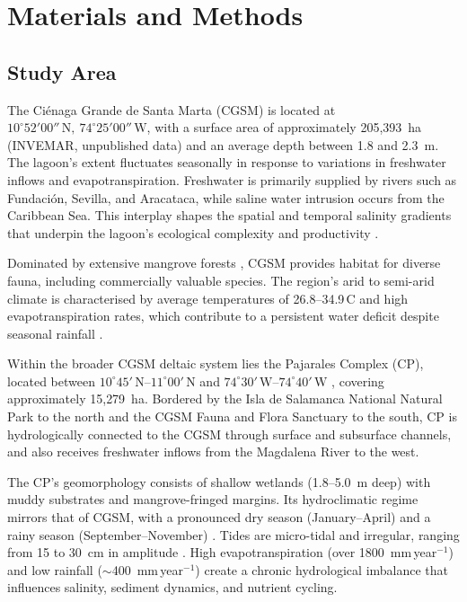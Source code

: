 \documentclass[remotesensing,article,submit,pdftex,moreauthors]{Definitions/mdpi}
\begin{document}
\section{Materials and Methods}
\subsection{Study Area}

The Ci\'{e}naga Grande de Santa Marta (CGSM) is located at
$10^\circ52'00''\,\text{N},\ 74^\circ25'00''\,\text{W}$,
with a surface area of approximately 205{,}393~ha (INVEMAR, unpublished
data) and an average depth between 1.8 and 2.3~m. The lagoon's extent
fluctuates seasonally in response to variations in freshwater inflows
and evapotranspiration. Freshwater is primarily supplied by rivers such
as Fundaci\'{o}n, Sevilla, and Aracataca, while saline water intrusion
occurs from the Caribbean Sea. This interplay shapes the spatial and
temporal salinity gradients that underpin the lagoon's ecological
complexity and productivity \citep{Tuchkovenko2003}.
 
Dominated by extensive mangrove forests \citep{Gonima1998, Konnerup2014},
CGSM provides habitat for diverse fauna, including commercially valuable
species. The region's arid to semi-arid climate is
characterised by average temperatures of
26.8--34.9\,\textdegree C and high evapotranspiration rates, which
contribute to a persistent water deficit despite seasonal rainfall
\citep{Hernandez1990}.
 
Within the broader CGSM deltaic system lies the Pajarales Complex (CP),
located between $10^\circ45'\,\text{N}$--$11^\circ00'\,\text{N}$ and
$74^\circ30'\,\text{W}$--$74^\circ40'\,\text{W}$
\citep{Invemar2014},
covering approximately 15{,}279~ha. Bordered by the Isla de Salamanca
National Natural Park to the north and the CGSM Fauna and Flora
Sanctuary to the south, CP is hydrologically connected to the CGSM
through surface and subsurface channels, and also receives freshwater
inflows from the Magdalena River to the west.
 
The CP's geomorphology consists of shallow wetlands (1.8--5.0~m deep)
with muddy substrates and mangrove-fringed margins. Its hydroclimatic
regime mirrors that of CGSM, with a pronounced dry season
(January--April) and a rainy season (September--November)
\citep{Blanco2006}. Tides are micro-tidal and irregular, ranging from
15 to 30~cm in amplitude
\citep{Cosel1985}.
High evapotranspiration (over 1800~mm\,year$^{-1}$) and low rainfall
($\sim$400~mm\,year$^{-1}$) create a chronic hydrological imbalance
that influences salinity, sediment dynamics, and nutrient cycling.
 
\end{document}
